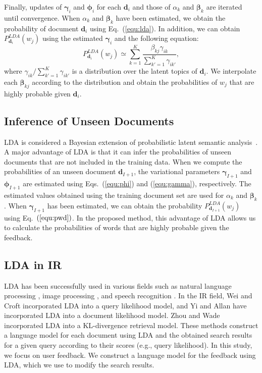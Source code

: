 \documentclass[english]{jnlp_1.4_rep}
\begin{document}
Finally, updates of $\bm{\gamma}_{i}$ and $\bm{\phi}_{i}$ for each
$\bm{d}_{i}$ and those of $\alpha_{k}$ and $\bm{\beta}_{k}$ are iterated
until convergence. When $\alpha_{k}$ and $\bm{\beta}_{k}$ have been
estimated, we obtain the probability of document $\bm{d}_{i}$ using
Eq.~(\ref{equ:lda}). In addition, we can obtain
$P^{LDA}_{\bm{d}_{i}}(w_{j})$ using the estimated $\bm{\gamma}_{i}$ and
the following equation:
\begin{equation}
 P^{LDA}_{\bm{d}_{i}}(w_{j})
 \simeq
 \sum_{k = 1}^{K}
 \frac{\beta_{kj} \gamma_{ik}}{\sum_{k' = 1}^{K} \gamma_{ik'}},
 \label{equ:pwd}
\end{equation}
where $\gamma_{ik}/\sum_{k'=1}^{K} \gamma_{ik'}$ is a distribution over
the latent topics of $\bm{d}_{i}$. We interpolate each $\bm{\beta}_{kj}$
according to the distribution and obtain the probabilities of $w_{j}$
that are highly probable given $\bm{d}_{i}$.


\subsection{Inference of Unseen Documents}
\label{ssec:inference}

LDA is considered a Bayesian extension of probabilistic latent semantic
analysis~\cite{Hofmann1999}. A major advantage of LDA is that it can
infer the probabilities of unseen documents that are not included in the
training data. When we compute the probabilities of an unseen document
$\bm{d}_{I+1}$, the variational parameters $\bm{\gamma}_{I+1}$ and
$\bm{\phi}_{I+1}$ are estimated using Eqs.~(\ref{equ:phi}) and
(\ref{equ:gamma}), respectively. The estimated values obtained using the
training document set are used for $\alpha_{k}$ and
$\bm{\beta}_{k}$. When $\bm{\gamma}_{I+1}$ has been estimated, we can
obtain the probability $P_{\bm{d}_{I+1}}^{LDA}(w_{j})$ using
Eq.~$(\ref{equ:pwd})$. In the proposed method, this advantage of LDA
allows us to calculate the probabilities of words that are highly
probable given the feedback.


\subsection{LDA in IR}

LDA has been successfully used in various fields such as natural
language processing \cite{Blei2003}, image
processing \cite{Fei-Fei2005}, and speech
recognition \cite{Heidel2007}. In the IR field, Wei and
Croft \citeyear{Wei2006} incorporated LDA into a query likelihood model,
and Yi and Allan \citeyear{Yi2009} have incorporated LDA into a document
likelihood model. Zhou and Wade \citeyear{Zhou2009} incorporated LDA
into a KL-divergence retrieval model. These methods construct a language
model for each document using LDA and the obtained search results for a
given query according to their scores (e.g., query likelihood). In this
study, we focus on user feedback. We construct a language model for the
feedback using LDA, which we use to modify the search results.
\end{document}
